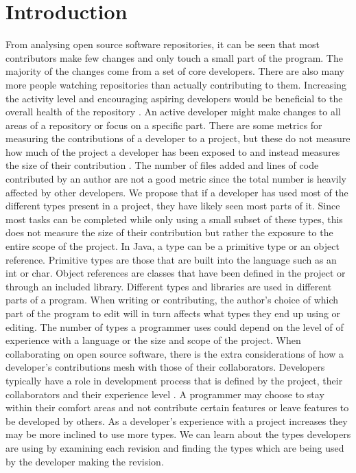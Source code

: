 \documentclass{sig-alternate-05-2015}
\begin{document}
\section{Introduction}
From analysing open source software repositories, it can be seen that most contributors make few changes and only touch a small part of the program. The majority of the changes come from a set of core developers. There are also many more people watching repositories than actually contributing to them. Increasing the activity level and encouraging aspiring developers would be beneficial to the overall health of the repository \cite{Patrick:Wagstrom:2012}. 
An active developer might make changes to all areas of a repository or focus on a specific part. There are some metrics for measuring the contributions of a developer to a project, but these do not measure how much of the project a developer has been exposed to and instead measures the size of their contribution \cite{KGSP09}. The number of files added and lines of code contributed by an author are not a good metric since the total number is heavily affected by other developers. We propose that if a developer has used most of the different types present in a project, they have likely seen most parts of it. Since most tasks can be completed while only using a small subset of these types, this does not measure the size of their contribution but rather the exposure to the entire scope of the project. 
In Java, a type can be a primitive type or an object reference. Primitive types are those that are built into the language such as an int or char. Object references are classes that have been defined in the project or through an included library. Different types and libraries are used in different parts of a program. When writing or contributing, the author's choice of which part of the program to edit will in turn affects what types they end up using or editing. 
The number of types a programmer uses could depend on the level of of experience with a language or the size and scope of the project. When collaborating on open source software, there is the extra considerations of how a developer's contributions mesh with those of their collaborators. Developers typically have a role in development process that is defined by the project, their collaborators and their experience level \cite{Patrick:Wagstrom:2012}. A programmer may choose to stay within their comfort areas and not contribute certain features or leave features to be developed by others. As a developer's experience with a project increases they may be more inclined to use more types.
We can learn about the types developers are using by examining each revision and finding the types which are being used by the developer making the revision.
\end{document}
